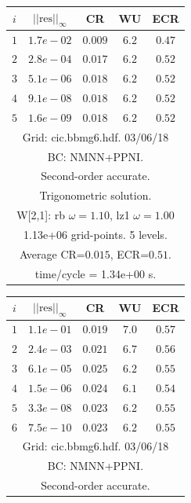 \begin{table}[hbt]
\begin{center}
{\tablefontsize
\begin{tabular}{|c|c|c|c|c|} \hline 
 $i$   & $\vert\vert\mbox{res}\vert\vert_\infty$  &  CR     &  WU    & ECR  \\   \hline 
 $ 1$  & $ 1.7e-02$ & $0.009$ & $ 6.2$ & $0.47$ \\ 
 $ 2$  & $ 2.8e-04$ & $0.017$ & $ 6.2$ & $0.52$ \\ 
 $ 3$  & $ 5.1e-06$ & $0.018$ & $ 6.2$ & $0.52$ \\ 
 $ 4$  & $ 9.1e-08$ & $0.018$ & $ 6.2$ & $0.52$ \\ 
 $ 5$  & $ 1.6e-09$ & $0.018$ & $ 6.2$ & $0.52$ \\ 
\hline 
\multicolumn{5}{|c|}{Grid: cic.bbmg6.hdf. 03/06/18}  \\
\multicolumn{5}{|c|}{BC: NMNN+PPNI.}  \\
\multicolumn{5}{|c|}{Second-order accurate.}  \\
\multicolumn{5}{|c|}{Trigonometric solution.}  \\
\multicolumn{5}{|c|}{W[2,1]: rb $\omega=1.10$, lz1 $\omega=1.00$}  \\
\multicolumn{5}{|c|}{1.13e+06 grid-points. 5 levels.}  \\
\multicolumn{5}{|c|}{Average CR=$0.015$, ECR=$0.51$.}  \\
\multicolumn{5}{|c|}{time/cycle = 1.34e+00 s.}  \\
\hline 
\end{tabular}
\begin{tabular}{|c|c|c|c|c|} \hline 
 $i$   & $\vert\vert\mbox{res}\vert\vert_\infty$  &  CR     &  WU    & ECR  \\   \hline 
 $ 1$  & $ 1.1e-01$ & $0.019$ & $ 7.0$ & $0.57$ \\ 
 $ 2$  & $ 2.4e-03$ & $0.021$ & $ 6.7$ & $0.56$ \\ 
 $ 3$  & $ 6.1e-05$ & $0.025$ & $ 6.2$ & $0.55$ \\ 
 $ 4$  & $ 1.5e-06$ & $0.024$ & $ 6.1$ & $0.54$ \\ 
 $ 5$  & $ 3.3e-08$ & $0.023$ & $ 6.2$ & $0.55$ \\ 
 $ 6$  & $ 7.5e-10$ & $0.023$ & $ 6.2$ & $0.55$ \\ 
\hline 
\multicolumn{5}{|c|}{Grid: cic.bbmg6.hdf. 03/06/18}  \\
\multicolumn{5}{|c|}{BC: NMNN+PPNI.}  \\
\multicolumn{5}{|c|}{Second-order accurate.}  \\

\end{tabular}}
\end{center}
\end{table}
